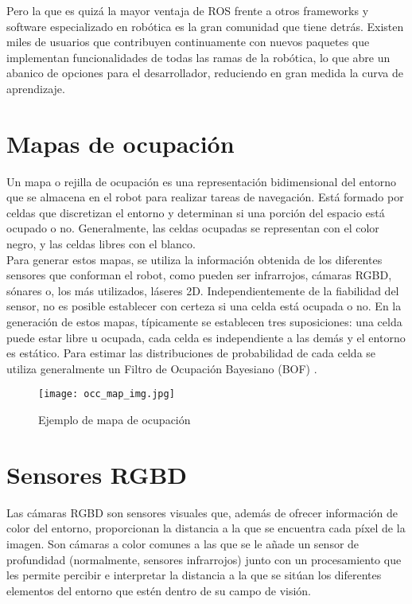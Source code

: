 Pero la que es quizá la mayor ventaja de ROS frente a otros frameworks y software especializado en robótica es la gran comunidad que tiene detrás. Existen miles de usuarios que contribuyen continuamente con nuevos paquetes que implementan funcionalidades de todas las ramas de la robótica, lo que abre un abanico de opciones para el desarrollador, reduciendo en gran medida la curva de aprendizaje.\\

\section{Mapas de ocupación}

Un mapa o rejilla de ocupación es una representación bidimensional del entorno que se almacena en el robot para realizar tareas de navegación. Está formado por celdas que discretizan el entorno y determinan si una porción del espacio está ocupado o no. Generalmente, las celdas ocupadas se representan con el color negro, y las celdas libres con el blanco.\\

Para generar estos mapas, se utiliza la información obtenida de los diferentes sensores que conforman el robot, como pueden ser infrarrojos, cámaras RGBD, sónares o, los más utilizados, láseres 2D. Independientemente de la fiabilidad del sensor, no es posible establecer con certeza si una celda está ocupada o no. En la generación de estos mapas, típicamente se establecen tres suposiciones: una celda puede estar libre u ocupada, cada celda es independiente a las demás y el entorno es estático. Para estimar las distribuciones de probabilidad de cada celda se utiliza generalmente un Filtro de Ocupación Bayesiano (BOF) \cite{occupancy_grid}.\\

\begin{figure}[h]
\begin{center} \label{fig:occ_map}
\texttt{[image: occ\_map\_img.jpg]}
\end{center}
\caption{Ejemplo de mapa de ocupación}
\end{figure}

\section{Sensores RGBD}

Las cámaras RGBD son sensores visuales que, además de ofrecer información de color del entorno, proporcionan la distancia a la que se encuentra cada píxel de la imagen. Son cámaras a color comunes a las que se le añade un sensor de profundidad (normalmente, sensores infrarrojos) junto con un procesamiento que les permite percibir e interpretar la distancia a la que se sitúan los diferentes elementos del entorno que estén dentro de su campo de visión.\\

